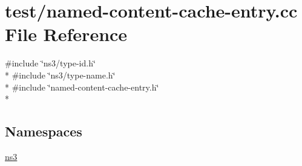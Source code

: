 \hypertarget{test_2named-content-cache-entry_8cc}{\section{test/named-\/content-\/cache-\/entry.cc File Reference}
\label{test_2named-content-cache-entry_8cc}
}
{\ttfamily \#include \char`\"{}ns3/type-\/id.\-h\char`\"{}}\\*
{\ttfamily \#include \char`\"{}ns3/type-\/name.\-h\char`\"{}}\\*
{\ttfamily \#include \char`\"{}named-\/content-\/cache-\/entry.\-h\char`\"{}}\\*
\subsection*{Namespaces}
\begin{DoxyCompactItemize}
\item 
\hyperlink{namespacens3}{ns3}
\end{DoxyCompactItemize}
